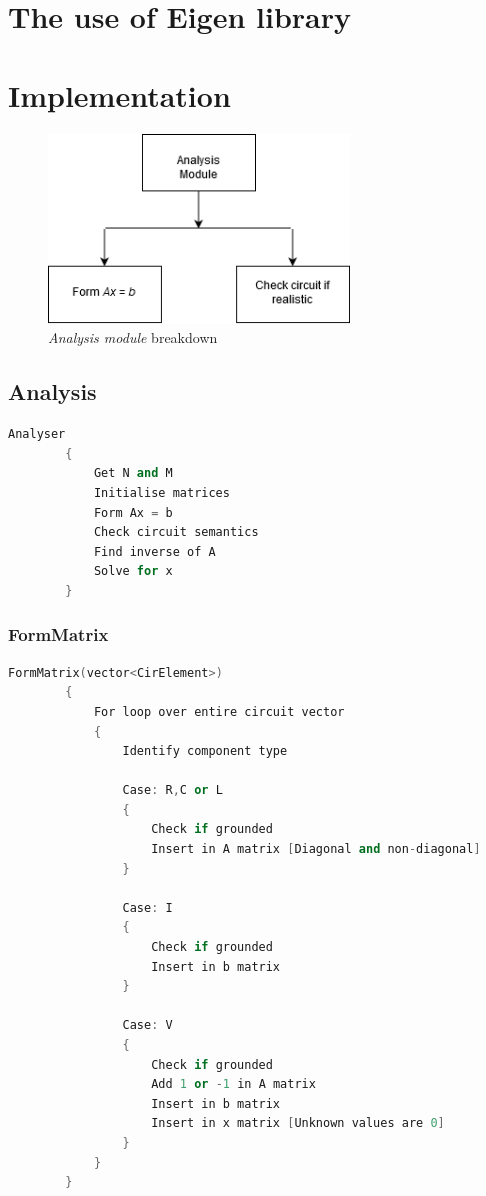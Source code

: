 \documentclass[a4paper, titlepage]{article}
\begin{document}
    \section{The use of Eigen library}


    \pagebreak    
    \section{Implementation}
    \begin{figure}[htp]
        \centering
        \includegraphics[width=80mm,scale=1]{Analysis breakdown}
        \caption{\textit{Analysis module} breakdown}
        \label{fig:figure3}
    \end{figure}

    \subsection{Analysis}
    \begin{lstlisting}[language=C++]
        Analyser
        {
            Get N and M
            Initialise matrices
            Form Ax = b
            Check circuit semantics
            Find inverse of A
            Solve for x
        }
    \end{lstlisting}

    \subsubsection{FormMatrix}
    \begin{lstlisting}[language=C++]
        FormMatrix(vector<CirElement>)
        {
            For loop over entire circuit vector
            {
                Identify component type

                Case: R,C or L
                {
                    Check if grounded
                    Insert in A matrix [Diagonal and non-diagonal]
                }
                
                Case: I
                {
                    Check if grounded
                    Insert in b matrix
                }

                Case: V
                {
                    Check if grounded
                    Add 1 or -1 in A matrix             
                    Insert in b matrix
                    Insert in x matrix [Unknown values are 0]            
                }
            }
        }
    \end{lstlisting}
\end{document}
